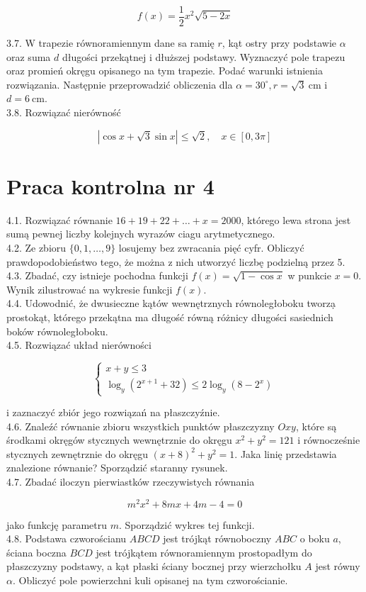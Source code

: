 \documentclass[10pt]{article}
\begin{document}
$$
f(x)=\frac{1}{2} x^{2} \sqrt{5-2 x}
$$

3.7. W trapezie równoramiennym dane sa ramię $r$, kąt ostry przy podstawie $\alpha$ oraz suma $d$ długości przekątnej i dłuższej podstawy. Wyznaczyć pole trapezu oraz promień okręgu opisanego na tym trapezie. Podać warunki istnienia rozwiązania. Następnie przeprowadzić obliczenia dla $\alpha=30^{\circ}, r=\sqrt{3} \mathrm{~cm}$ i $d=6 \mathrm{~cm}$.\\
3.8. Rozwiązać nierówność

$$
|\cos x+\sqrt{3} \sin x| \leq \sqrt{2}, \quad x \in[0,3 \pi]
$$

\section*{Praca kontrolna nr 4}
4.1. Rozwiązać równanie $16+19+22+\ldots+x=2000$, którego lewa strona jest sumą pewnej liczby kolejnych wyrazów ciagu arytmetycznego.\\
4.2. Ze zbioru $\{0,1, \ldots, 9\}$ losujemy bez zwracania pięć cyfr. Obliczyć prawdopodobieństwo tego, że można z nich utworzyć liczbę podzielną przez 5.\\
4.3. Zbadać, czy istnieje pochodna funkcji $f(x)=\sqrt{1-\cos x}$ w punkcie $x=0$. Wynik zilustrować na wykresie funkcji $f(x)$.\\
4.4. Udowodnić, że dwusieczne kątów wewnętrznych równoległoboku tworzạ prostokąt, którego przekątna ma długość równą różnicy długości sasiednich boków równoległoboku.\\
4.5. Rozwiązać układ nierówności

$$
\left\{\begin{array}{l}
x+y \leq 3 \\
\log _{y}\left(2^{x+1}+32\right) \leq 2 \log _{y}\left(8-2^{x}\right)
\end{array}\right.
$$

i zaznaczyć zbiór jego rozwiązań na płaszczyźnie.\\
4.6. Znaleźć równanie zbioru wszystkich punktów płaszczyzny $O x y$, które są środkami okręgów stycznych wewnętrznie do okręgu $x^{2}+y^{2}=121$ i równocześnie stycznych zewnętrznie do okręgu $(x+8)^{2}+y^{2}=1$. Jaka linię przedstawia znalezione równanie? Sporządzić staranny rysunek.\\
4.7. Zbadać iloczyn pierwiastków rzeczywistych równania

$$
m^{2} x^{2}+8 m x+4 m-4=0
$$

jako funkcję parametru $m$. Sporządzić wykres tej funkcji.\\
4.8. Podstawa czworościanu $A B C D$ jest trójkąt równoboczny $A B C$ o boku $a$, ściana boczna $B C D$ jest trójkątem równoramiennym prostopadłym do płaszczyzny podstawy, a kạt płaski ściany bocznej przy wierzchołku $A$ jest równy $\alpha$. Obliczyć pole powierzchni kuli opisanej na tym czworościanie.
\end{document}
